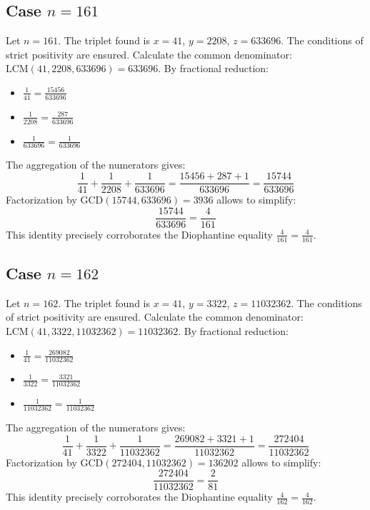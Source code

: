 \documentclass[11pt,a4paper]{article}
\begin{document}
\subsection{Case $n = 161$}
Let $n = 161$. The triplet found is $x = 41$, $y = 2208$, $z = 633696$.
The conditions of strict positivity are ensured.
Calculate the common denominator: $\text{LCM}(41, 2208, 633696) = 633696$.
By fractional reduction:
\begin{itemize}
    \item $\frac{1}{41} = \frac{15456}{633696}$
    \item $\frac{1}{2208} = \frac{287}{633696}$
    \item $\frac{1}{633696} = \frac{1}{633696}$
\end{itemize}
The aggregation of the numerators gives:
$$ \frac{1}{41} + \frac{1}{2208} + \frac{1}{633696} = \frac{15456 + 287 + 1}{633696} = \frac{15744}{633696} $$
Factorization by $\text{GCD}(15744, 633696) = 3936$ allows to simplify:
$$ \frac{15744}{633696} = \frac{4}{161} $$
This identity precisely corroborates the Diophantine equality $\frac{4}{161} = \frac{4}{161}$.

\subsection{Case $n = 162$}
Let $n = 162$. The triplet found is $x = 41$, $y = 3322$, $z = 11032362$.
The conditions of strict positivity are ensured.
Calculate the common denominator: $\text{LCM}(41, 3322, 11032362) = 11032362$.
By fractional reduction:
\begin{itemize}
    \item $\frac{1}{41} = \frac{269082}{11032362}$
    \item $\frac{1}{3322} = \frac{3321}{11032362}$
    \item $\frac{1}{11032362} = \frac{1}{11032362}$
\end{itemize}
The aggregation of the numerators gives:
$$ \frac{1}{41} + \frac{1}{3322} + \frac{1}{11032362} = \frac{269082 + 3321 + 1}{11032362} = \frac{272404}{11032362} $$
Factorization by $\text{GCD}(272404, 11032362) = 136202$ allows to simplify:
$$ \frac{272404}{11032362} = \frac{2}{81} $$
This identity precisely corroborates the Diophantine equality $\frac{4}{162} = \frac{4}{162}$.
\end{document}
